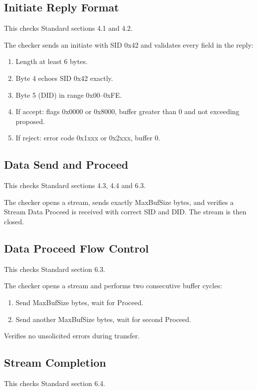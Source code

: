 \subsection{Initiate Reply Format}

This checks Standard sections 4.1 and 4.2.

The checker sends an initiate with SID 0x42 and validates every field in the
reply:
\begin{enumerate}
\item Length at least 6 bytes.
\item Byte 4 echoes SID 0x42 exactly.
\item Byte 5 (DID) in range 0x00--0xFE.
\item If accept: flags 0x0000 or 0x8000, buffer greater than 0 and not
    exceeding proposed.
\item If reject: error code 0x1xxx or 0x2xxx, buffer 0.
\end{enumerate}

\subsection{Data Send and Proceed}

This checks Standard sections 4.3, 4.4 and 6.3.

The checker opens a stream, sends exactly MaxBufSize bytes, and verifies a
Stream Data Proceed is received with correct SID and DID.  The stream is then
closed.

\subsection{Data Proceed Flow Control}

This checks Standard section 6.3.

The checker opens a stream and performs two consecutive buffer cycles:
\begin{enumerate}
\item Send MaxBufSize bytes, wait for Proceed.
\item Send another MaxBufSize bytes, wait for second Proceed.
\end{enumerate}
Verifies no unsolicited errors during transfer.

\subsection{Stream Completion}

This checks Standard section 6.4.

